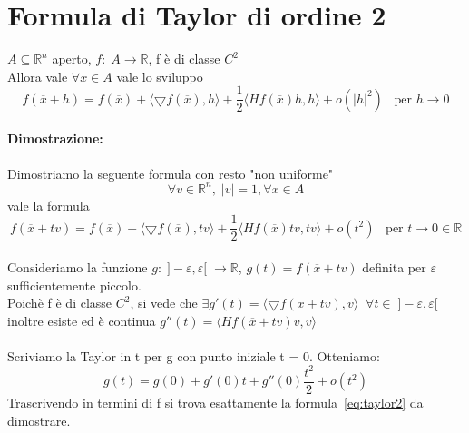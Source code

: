\documentclass[12pt]{article}
\newcommand {\R}{\mathbb{R}}
\begin{document}
\section{Formula di Taylor di ordine 2}

$A\subseteq \R^n$ aperto, $f:\;A\rightarrow \R$, f è di classe $C^2$\\
Allora vale $\forall \overline{x} \in A$ vale lo sviluppo
$$f(\overline{x} + h) = f(\overline{x}) + \langle \bigtriangledown f(\overline{x}), h \rangle + \frac{1}{2}\langle Hf(\overline{x})h, h \rangle + o(\rvert h \rvert ^2)\;\;\;\text{per } h\rightarrow 0$$

\paragraph*{Dimostrazione:}
Dimostriamo la seguente formula con resto "non uniforme"
$$\forall v \in \R ^n,\; \rvert v\rvert = 1, \forall x \in A$$
vale la formula
\begin{equation}\label{eq:taylor2}
    f(\overline{x} + tv) = f(\overline{x}) + \langle \bigtriangledown f(\overline{x}), tv \rangle + \frac{1}{2}\langle Hf(\overline{x})tv, tv \rangle + o(t ^2)\;\;\;\text{per } t\rightarrow 0 \in \R
\end{equation}
\\
Consideriamo la funzione $g:\;]-\varepsilon, \varepsilon[ \;\rightarrow \R$, $g(t) = f(\overline{x} + tv)$
            definita per $\varepsilon$  sufficientemente piccolo. \\
            Poichè f è di classe $C^2$, si vede che
        $\exists g'(t) = \langle \bigtriangledown f(\overline{x}+tv), v \rangle\;\;\forall t \in \;]-\varepsilon, \varepsilon[$
inoltre esiste ed è  continua $g''(t) = \langle Hf(\overline{x}+tv)v, v \rangle$
\\\\
Scriviamo la Taylor in t per g con punto iniziale t = 0. Otteniamo:
$$g(t) = g(0) + g'(0)t + g''(0)\frac{t^2}{2} + o(t^2)$$
Trascrivendo in termini di f si trova esattamente la formula~\ref{eq:taylor2} da dimostrare.
\end{document}
